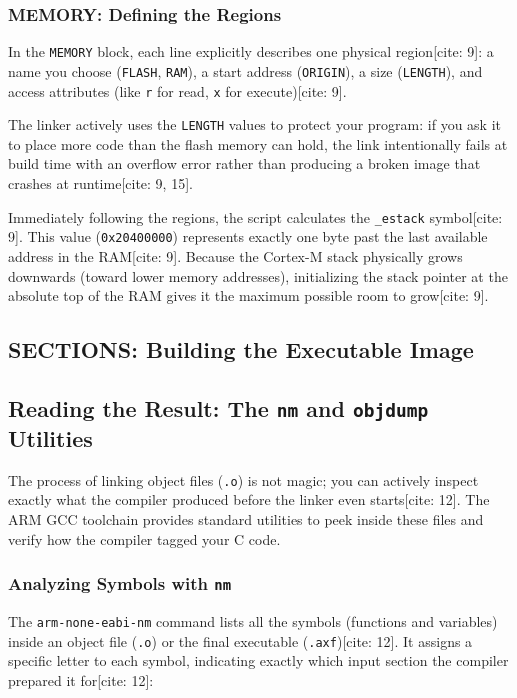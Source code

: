 \subsubsection{MEMORY: Defining the Regions}
In the \texttt{MEMORY} block, each line explicitly describes one physical region[cite: 9]: a name you choose (\texttt{FLASH}, \texttt{RAM}), a start address (\texttt{ORIGIN}), a size (\texttt{LENGTH}), and access attributes (like \texttt{r} for read, \texttt{x} for execute)[cite: 9]. 

The linker actively uses the \texttt{LENGTH} values to protect your program: if you ask it to place more code than the flash memory can hold, the link intentionally fails at build time with an overflow error rather than producing a broken image that crashes at runtime[cite: 9, 15].

Immediately following the regions, the script calculates the \texttt{\_estack} symbol[cite: 9]. This value (\texttt{0x20400000}) represents exactly one byte past the last available address in the RAM[cite: 9]. Because the Cortex-M stack physically grows downwards (toward lower memory addresses), initializing the stack pointer at the absolute top of the RAM gives it the maximum possible room to grow[cite: 9].

\subsection{SECTIONS: Building the Executable Image}

\subsection{Reading the Result: The \texttt{nm} and \texttt{objdump} Utilities}
The process of linking object files (\texttt{.o}) is not magic; you can actively inspect exactly what the compiler produced before the linker even starts[cite: 12]. The ARM GCC toolchain provides standard utilities to peek inside these files and verify how the compiler tagged your C code.

\subsubsection{Analyzing Symbols with \texttt{nm}}
The \texttt{arm-none-eabi-nm} command lists all the symbols (functions and variables) inside an object file (\texttt{.o}) or the final executable (\texttt{.axf})[cite: 12]. It assigns a specific letter to each symbol, indicating exactly which input section the compiler prepared it for[cite: 12]:

